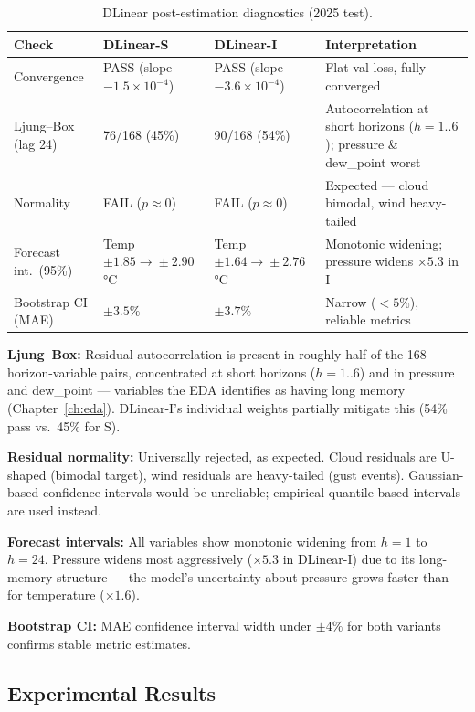 \documentclass[12pt,a4paper,oneside]{report}
\begin{document}
\begin{table}[H]
\centering
\caption{DLinear post-estimation diagnostics (2025 test).}
\small
\begin{tabular}{l p{2.3cm} p{2.3cm} p{5.2cm}}
\toprule
\textbf{Check} & \textbf{DLinear-S} & \textbf{DLinear-I} &
\textbf{Interpretation} \\
\midrule
Convergence
  & PASS (slope $-1.5\!\times\!10^{-4}$)
  & PASS (slope $-3.6\!\times\!10^{-4}$)
  & Flat val loss, fully converged \\
Ljung--Box (lag 24)
  & 76/168 (45\%)
  & 90/168 (54\%)
  & Autocorrelation at short horizons ($h=1..6$); pressure
    \& dew\_point worst \\
Normality
  & FAIL ($p\approx 0$)
  & FAIL ($p\approx 0$)
  & Expected --- cloud bimodal, wind heavy-tailed \\
Forecast int.\ (95\%)
  & Temp $\pm 1.85\!\to\!\pm 2.90$\,°C
  & Temp $\pm 1.64\!\to\!\pm 2.76$\,°C
  & Monotonic widening; pressure widens $\times 5.3$ in I \\
Bootstrap CI (MAE)
  & $\pm 3.5\%$
  & $\pm 3.7\%$
  & Narrow ($<5\%$), reliable metrics \\
\bottomrule
\end{tabular}
\end{table}

\textbf{Ljung--Box:} Residual autocorrelation is present in roughly half of the
168 horizon-variable pairs, concentrated at short horizons ($h=1..6$) and in
pressure and dew\_point --- variables the EDA identifies as having long memory
(Chapter~\ref{ch:eda}). DLinear-I's individual weights partially mitigate this (54\% pass
vs.\ 45\% for S).

\textbf{Residual normality:} Universally rejected, as expected. Cloud residuals
are U-shaped (bimodal target), wind residuals are heavy-tailed (gust events).
Gaussian-based confidence intervals would be unreliable; empirical quantile-based
intervals are used instead.

\textbf{Forecast intervals:} All variables show monotonic widening from $h=1$ to
$h=24$. Pressure widens most aggressively ($\times 5.3$ in DLinear-I) due to its
long-memory structure --- the model's uncertainty about pressure grows faster
than for temperature ($\times 1.6$).

\textbf{Bootstrap CI:} MAE confidence interval width under $\pm 4\%$ for both
variants confirms stable metric estimates.

\subsection{Experimental Results}
\end{document}
